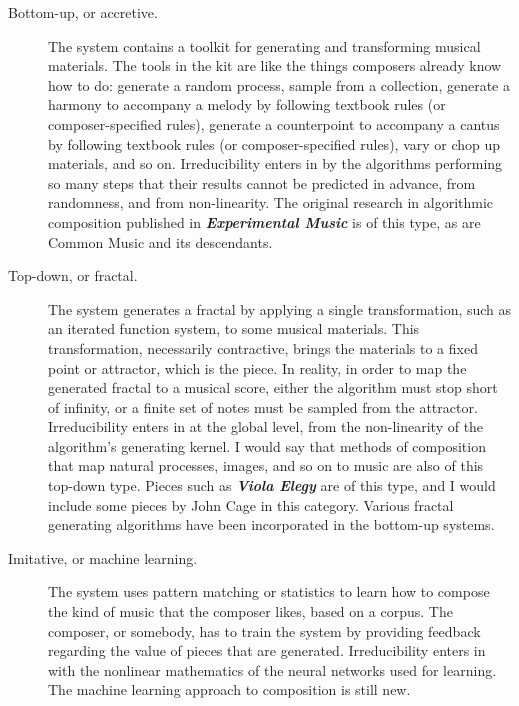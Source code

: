 \documentclass[english,11pt,letterpaper,onecolumn]{scrartcl}
\numberwithin{equation}{section}
\begin{document}
\begin{description}
	\item[Bottom-up, or accretive.] The system contains a toolkit for generating and transforming musical materials. The tools in the kit are like the things composers already know how to do: generate a random process, sample from a collection, generate a harmony to accompany a melody by following textbook rules (or composer-specified rules), generate a counterpoint to accompany a cantus by following textbook rules (or composer-specified rules), vary or chop up materials, and so on. Irreducibility enters in by the algorithms performing so many steps that their results cannot be predicted in advance, from randomness, and from non-linearity. The original research in algorithmic composition published in \textit{\textbf{Experimental Music}} is of this type, as are Common Music and its descendants.
	
	\item[Top-down, or fractal.] The system generates a fractal by applying a single transformation, such as an iterated function system, to some musical materials. This transformation, necessarily contractive, brings the materials to a fixed point or attractor, which is the piece. In reality, in order to map the generated fractal to a musical score, either the algorithm must stop short of infinity, or a finite set of notes must be sampled from the attractor. Irreducibility enters in at the global level, from the non-linearity of the algorithm's generating kernel. I would say that methods of composition that map natural processes, images, and so on to music are also of this top-down type. Pieces such as \textit{\textbf{Viola Elegy}} are of this type, and I would include some pieces by John Cage in this category. Various fractal generating algorithms have been incorporated in the bottom-up systems.
	
	\item[Imitative, or machine learning.] The system uses pattern matching or statistics to learn how to compose the kind of music that the composer likes, based on a corpus. The composer, or somebody, has to train the system by providing feedback regarding the value of pieces that are generated. Irreducibility enters in with the nonlinear mathematics of the neural networks used for learning. The machine learning approach to composition is still new.
\end{description}
\end{document}
